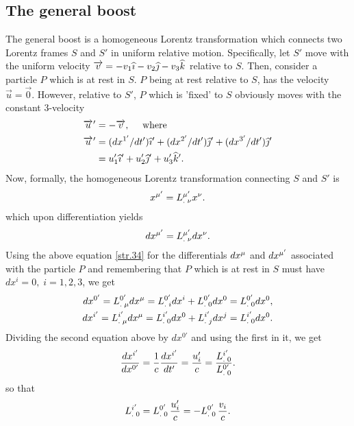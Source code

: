 \begin{small}
\section{The general boost} 

The general boost is a homogeneous Lorentz transformation 
which connects two Lorentz frames $S$ and $S'$ in 
uniform relative motion. Specifically, let $S'$ move with 
the uniform velocity $\overrightarrow{v}=-v_1{\widehat{\imath}} - v_2{\widehat{\jmath}} -v_3{\widehat{k}}$ 
relative to $S$. Then, consider a particle $P$ which is at 
rest in  $S$. $P $ being at rest relative to $S$, has the 
velocity $\vec{u}=\vec{0} $. However, relative to $S'$, $P$ 
which is 'fixed' to $S$ obviously moves with the constant 
3-velocity
\begin{align}\label{str.33}
{\ensuremath{\overrightarrow{u}\hspace*{.3pt}'}} &=-\overrightarrow{v},\quad \text{ where}\notag\\
{\overrightarrow{u}\hspace*{.3pt}'}
&=(dx^{1'}/dt'){\widehat{\imath}}'+(dx^{2'}/dt'){\widehat{\jmath}}'+(dx^{3'
} /dt'){\widehat{\jmath}}'
\notag\\&=u_1'{\widehat{\imath}}' + u_2'{\widehat{\jmath}}' +u_3'{\widehat{k}}'.
\end{align}
Now, formally, the homogeneous Lorentz transformation 
connecting
$S$ and $S'$ is
\begin{align*}
x^{{\mu}'} ={{L}^{{\mu}'}_{.\;{\nu}}}x^{{\nu}}.
\end{align*}
which upon differentiation yields
\begin{align}\label{str.34}
dx^{{\mu}'} ={{L}^{{\mu}'}_{.\;{\nu}}}dx^{{\nu}} .
\end{align}
Using the above equation \eqref{str.34} for the 
differentials $dx^{{\mu}} $ and $dx^{{\mu}'}$ associated with 
the particle $P$ and remembering that $P$ which is at rest 
in  $S$ must have $dx^i =0 ,\;i= 1,2,3$, we get
\begin{align}\label{str.35}
dx^{0'}={{L}^{0'}_{.\;{\mu}}}dx^{{\mu}}
={{L}^{0'}_{.\;i}}dx^i+{{L}^{0'}_{.\;0}}dx^0={{
L}^{0'}_{.\;0}}dx^0,\notag \\
dx^{i'}={{L}^{i'}_{.\;{\mu}}}dx^{{\mu}}
={{L}^{i'}_{.\;0}}dx^0+{{L}^{i'}_{.\;j}}dx^j={{L}^{i'}_{.\;0}}
dx^0.
\end{align}
Dividing the second equation above by $dx^{0'}$ and using 
the first in it, we get 
\begin{align*}
\frac{dx^{i'}}{dx^{0'}}=\frac{1}{c}\frac{dx^{i'}}{ dt'}=
\frac{u'_i}{ c } = \frac{{{L}^{ i' }_{.\;0}}} {{{L}^{0'}_{.\;0}}}.
\end{align*}
so that
\begin{align}\label{str.36}
 {\ensuremath{{L}^{ i '}_{.\;0}}} = {{L}^{0'}_{.\;0}}\,\frac{u'_i}{c}
=-{{L}^{0'}_{.\;0}}\,\frac{v_i}{c}.
\end{align}

\end{small}
